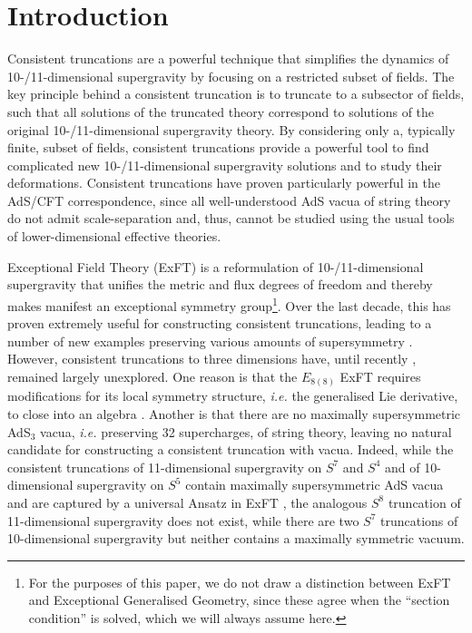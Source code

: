 \documentclass[a4paper, 11pt]{article}
\numberwithin{equation}{section}
\newcommand{\EE}{\ensuremath{E_{8(8)}}\xspace}
\newcommand{\+}{\oplus}
\begin{document}
\tableofcontents
	
\newpage

\section{Introduction}
Consistent truncations are a powerful technique that simplifies the dynamics of 10-/11-dimensional supergravity by focusing on a restricted subset of fields. The key principle behind a consistent truncation is to truncate to a subsector of fields, such that all solutions of the truncated theory correspond to solutions of the original 10-/11-dimensional supergravity theory. By considering only a, typically finite, subset of fields, consistent truncations provide a powerful tool to find complicated new 10-/11-dimensional supergravity solutions and to study their deformations. Consistent truncations have proven particularly powerful in the AdS/CFT correspondence, since all well-understood AdS vacua of string theory do not admit scale-separation and, thus, cannot be studied using the usual tools of lower-dimensional effective theories.

Exceptional Field Theory (ExFT) is a reformulation of 10-/11-dimensional supergravity that unifies the metric and flux degrees of freedom and thereby makes manifest an exceptional symmetry group\footnote{For the purposes of this paper, we do not draw a distinction between ExFT and Exceptional Generalised Geometry, since these agree when the ``section condition'' is solved, which we will always assume here.}. Over the last decade, this has proven extremely useful for constructing consistent truncations, leading to a number of new examples preserving various amounts of supersymmetry \cite{Hohm:2014qga,Lee:2014mla,Malek:2015hma,Baguet:2015sma,Baguet:2015iou,Lee:2015xga,Malek:2016bpu,Ciceri:2016dmd,Cassani:2016ncu,Inverso:2016eet,Malek:2017cle,Malek:2017njj,Malek:2018zcz,Malek:2019ucd,Cassani:2019vcl,Malek:2020jsa,Cassani:2020cod}. However, consistent truncations to three dimensions have, until recently \cite{Galli:2022idq}, remained largely unexplored. One reason is that the $\EE$ ExFT requires modifications for its local symmetry structure, \textit{i.e.} the generalised Lie derivative, to close into an algebra \cite{Hohm:2014fxa,Cederwall:2015ica}. Another is that there are no maximally supersymmetric AdS$_3$ vacua, \textit{i.e.} preserving 32 supercharges, of string theory, leaving no natural candidate for constructing a consistent truncation with vacua. Indeed, while the consistent truncations of 11-dimensional supergravity on $S^7$ and $S^4$ and of 10-dimensional supergravity on $S^5$ contain maximally supersymmetric AdS vacua and are captured by a universal Ansatz in ExFT \cite{Hohm:2014qga,Lee:2014mla}, the analogous $S^8$ truncation of 11-dimensional supergravity does not exist, while there are two $S^7$ truncations of 10-dimensional supergravity but neither contains a maximally symmetric vacuum\cite{Fischbacher:2003yw,Galli:2022idq}.
\end{document}
